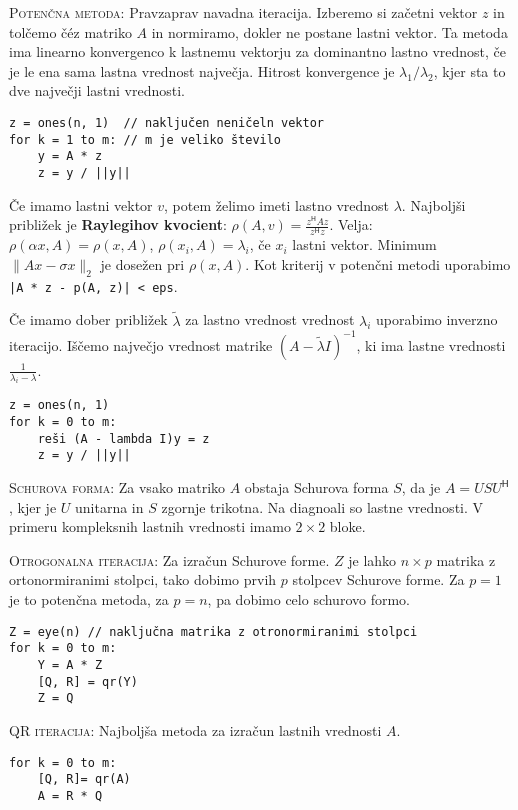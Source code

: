 \documentclass[a4paper,10pt]{article}
\theoremstyle{definition}
\renewcommand{\H}{\mathsf{H}\!}
\begin{document}
\textsc{Potenčna metoda:} Pravzaprav navadna iteracija. Izberemo si začetni
vektor $z$ in tolčemo č\'{e}z matriko $A$ in normiramo, dokler ne postane lastni vektor. Ta
metoda ima linearno konvergenco k lastnemu vektorju za dominantno lastno
vrednost, če je le ena sama lastna vrednost največja.
Hitrost konvergence je $\lambda_1 / \lambda_2$, kjer sta to dve
največji lastni vrednosti.
\scriptsize
\begin{verbatim}
z = ones(n, 1)  // naključen neničeln vektor
for k = 1 to m: // m je veliko število
    y = A * z
    z = y / ||y||
\end{verbatim}
\normalsize
Če imamo lastni vektor $v$, potem želimo imeti lastno vrednost $\lambda$.
Najboljši približek je \textbf{Raylegihov kvocient}: $\rho(A, v) = \frac{z^\H\!\!Az}{z^\H
z}$. Velja: $\rho(\alpha x, A) = \rho(x, A)$, $\rho(x_i, A) = \lambda_i$, če
$x_i$ lastni vektor. Minimum $\|Ax-\sigma x\|_2$ je dosežen pri $\rho(x, A)$.
Kot kriterij v potenčni metodi uporabimo \verb'|A * z - p(A, z)| < eps'.

Če imamo dober približek $\tilde{\lambda}$ za lastno vrednost vrednost
$\lambda_i$ uporabimo inverzno iteracijo. Iščemo največjo vrednost matrike
$(A-\tilde{\lambda}I)^{-1}$, ki
ima lastne vrednosti $\frac{1}{\lambda_i - \lambda}$.
\scriptsize
\begin{verbatim}
z = ones(n, 1)
for k = 0 to m:
    reši (A - lambda I)y = z
    z = y / ||y||
\end{verbatim}
\normalsize

\textsc{Schurova forma:} Za vsako matriko $A$ obstaja Schurova forma $S$, da je
$A = USU^\H$,
kjer je $U$ unitarna in $S$ zgornje trikotna. Na diagnoali so lastne vrednosti.
V primeru kompleksnih lastnih vrednosti imamo $2\times2$ bloke.

\textsc{Otrogonalna iteracija:} Za izračun Schurove forme. $Z$ je lahko $n\times
p$ matrika z ortonormiranimi stolpci, tako dobimo prvih $p$ stolpcev Schurove
forme. Za $p = 1$ je to potenčna metoda, za $p = n$, pa dobimo celo schurovo
formo.
\scriptsize
\begin{verbatim}
Z = eye(n) // naključna matrika z otronormiranimi stolpci
for k = 0 to m:
    Y = A * Z
    [Q, R] = qr(Y)
    Z = Q
\end{verbatim}
\normalsize

\textsc{QR iteracija:} Najboljša metoda za izračun lastnih vrednosti $A$.
\scriptsize
\begin{verbatim}
for k = 0 to m:
    [Q, R]= qr(A)
    A = R * Q
\end{verbatim}
\normalsize
\end{document}
